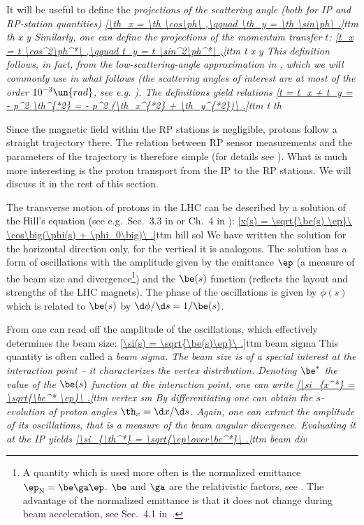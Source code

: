 It will be useful to define the \em{projections of the scattering angle} (both for IP and RP-station quantities)
\eqref{\th_x = \th \cos\ph\ ,\qquad \th_y = \th \sin\ph\ .}{ttm th x y}
Similarly, one can define the projections of the momentum transfer $t$:
\eqref{t_x = t \cos^2\ph^*\ ,\qquad t_y = t \sin^2\ph^*\ ,}{ttm t x y}
This definition follows, in fact, from the low-scattering-angle approximation in , which we will commonly use in what follows (the scattering angles of interest are at most of the order $10^{-3}\un{rad}$, see e.g. ). The definitions  yield relations
\eqref{t = t_x + t_y = - p^2 \th^{*2} = - p^2 (\th_x^{*2} + \th_y^{*2})\ .}{ttm t th}

Since the magnetic field within the RP stations is negligible, protons follow a straight trajectory there. The relation between RP sensor measurements and the parameters of the trajectory is therefore simple (for details see ). What is much more interesting is the proton transport from the IP to the RP stations. We will discuss it in the rest of this section.

The transverse motion of protons in the LHC can be described by a solution of the Hill's equation (see e.g.~Sec.~3.3 in  or Ch.~4 in ):
\eqref{x(s) = \sqrt{\be(s) \ep}\ \cos\big(\phi(s) + \phi_0\big)\ .}{ttm hill sol}
We have written the solution for the horizontal direction only, for the vertical it is analogous. The solution has a form of oscillations with the amplitude given by the emittance $\ep$ (a measure of the beam size and divergence\footnote{%
A quantity which is used more often is the normalized emittance $\ep_{\rm N} = \be\ga \ep$. $\be$ and $\ga$ are the relativistic factors, see . The advantage of the normalized emittance is that it does not change during beam acceleration, see Sec.~4.1 in~.
}) and the $\be(s)$ function (reflects the layout and strengths of the LHC magnets). The phase of the oscillations is given by $\phi(s)$ which is related to $\be(s)$ by $\d\phi/\d s = 1/\be(s)$.

From  one can read off the amplitude of the oscillations, which effectively determines the beam size:
\eqref{\si(s) = \sqrt{\be(s)\ep}\ .}{ttm beam sigma}
This quantity is often called a \em{beam sigma}. The beam size is of a special interest at the interaction point -- it characterizes the vertex distribution. Denoting $\be^*$ the value of the $\be(s)$ function at the interaction point, one can write
\eqref{\si_{x^*} = \sqrt{\be^* \ep}\ .}{ttm vertex sm}
By differentiating  one can obtain the $s$-evolution of proton angles $\th_x = \d x/\d s$. Again, one can extract the amplitude of its oscillations, that is a measure of the beam angular divergence. Evaluating it at the IP yields
\eqref{\si_{\th^*} = \sqrt{\ep\over\be^*}\ .}{ttm beam div}

